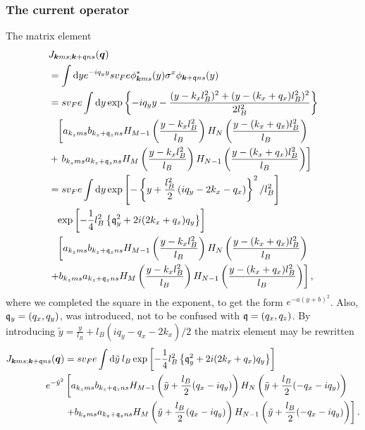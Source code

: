 \subsubsection{The current operator}
The matrix element
\begin{align}
  &J_{\vec{k}ms; \vec{k}+\qvec{q} ns}(\vec{q})\\
  \nonumber &=  \int \mathrm{d}y
    e^{-iq_yy} sv_Fe \phi ^{*}_{\vec{k} ms}(y)
    \sigma ^x
    \phi _{\vec{k} +\qvec{q} ns}(y)\\
  &= s v_F e \int \mathrm{d}y
    \exp \left\{
    - i q_yy - \frac{(y-k_xl_B^2)^2 + (y-(k_x + q_x) l_B^2)^2}{2 l_B^2}
    \right\}\\
  \nonumber &\pe \left[
    a_{k_zms}b_{k_z + \qvec{q}_z ns} H_{M-1} \left( \frac{y - k_xl_B^2}{l_B} \right) H_N\left( \frac{y - (k_x + q_x) l_B^2}{l_B} \right)\right.\\
  \nonumber &+
    \left.  b_{k_zms} a_{k_z + \qvec{q}_z ns}
    H_M \left( \frac{y - k_xl_B^2}{l_B} \right)
    H_{N-1} \left( \frac{y - (k_x+ q_x) l_B^2}{l_B} \right)
    \right]\\
  &= s v_F e \int \mathrm{d}y
    \exp \left[-\left\{
    y+ \frac{l_B^2}{2} \left( iq_y - 2k_x - q_x \right)
    \right\}^2 /l_B^2\right]\\
  \nonumber &\pe \exp \left[- \frac{1}{4} l_B^2 \left\{
    \qvec{q}_y^2 + 2 i (2k_x + q_x) q_y 
    \right\}\right]\\
  \nonumber &\pe \left[
    a_{k_zms}b_{k_z + \qvec{q}_z ns} H_{M-1} \left( \frac{y - k_xl_B^2}{l_B} \right) H_N\left( \frac{y - (k_x + q_x) l_B^2}{l_B} \right) \right.\\
  \nonumber &\left. +
    b_{k_zms} a_{k_z + \qvec{q}_z ns}
    H_M \left( \frac{y - k_xl_B^2}{l_B} \right)
    H_{N-1} \left( \frac{y - (k_x + q_x) l_B^2}{l_B} \right)
    \right],
\end{align}
where we completed the square in the exponent, to get the form $e^{-a(y + b)^2}$.
Also, $\mathfrak{q}_y=(q_x, q_y)$, was introduced, not to be confused with $\mathfrak{q} = (q_x, q_z)$.
By introducing $\tilde{y} = \frac{y}{l_{B}} + l_B(iq_y - q_x - 2 k_x) / 2$ the matrix element may be rewritten
\begin{equation}
  \label{eq:51}
  \begin{split}
    J_{\bm{k}ms; \bm{k}+\mathfrak{q} ns}(\bm{q}) &=
    s v_F e \int \mathrm{d}\tilde{y} \: l_B
\exp \left[- \frac{1}{4} l_B^2 \left\{
    \mathfrak{q}_y^2 + 2 i (2k_x + q_x) q_y 
    \right\}\right]\\
  e^{-\tilde{y}^2}
   &\left[
    a_{k_zms}b_{k_z + \mathfrak{q}_z ns}
    H_{M-1} \left( \tilde{y} + \frac{l_B}{2}(q_x - iq_y) \right)
    H_N\left( \tilde{y} + \frac{l_B}{2}(-q_x - iq_y) \right) \right.\\
   &\left. +
    b_{k_zms} a_{k_z + \mathfrak{q}_z ns}
    H_M \left( \tilde{y} + \frac{l_B}{2}(q_x - iq_y) \right)
    H_{N-1} \left( \tilde{y} +  \frac{l_B}{2}(-q_x - iq_y)\right)
    \right].
  \end{split}
\end{equation}
